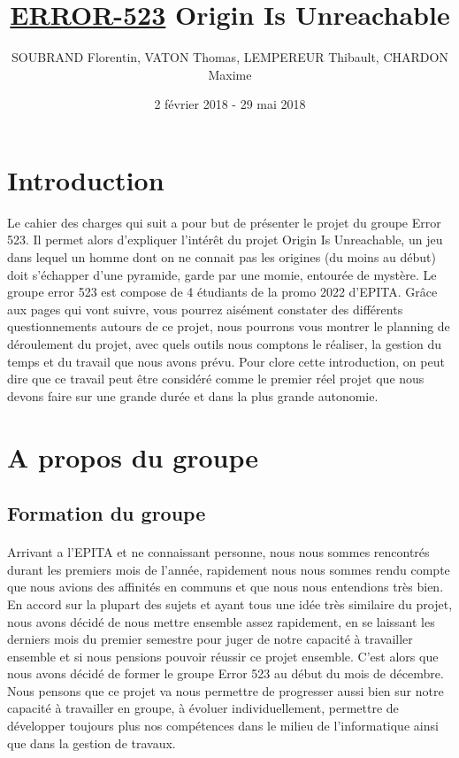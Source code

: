 \documentclass[12pt,a4paper]{article}
\title{\textbf { \huge{\underline{ERROR-523}} \bigbreak  \large{Origin Is Unreachable}}}
\author{SOUBRAND Florentin, VATON Thomas, LEMPEREUR Thibault, CHARDON Maxime}
\date {2 février 2018 - 29 mai 2018}
\begin{document}
\pagestyle{fancy}




\newpage
\thispagestyle{empty}
\tableofcontents

\newpage

\section{Introduction}
Le cahier des charges qui suit a pour but de présenter le projet du groupe Error 523.
Il permet alors d'expliquer l'intérêt du projet Origin Is Unreachable, un jeu dans lequel un homme dont
on ne connait pas les origines (du moins au début) doit s'échapper d'une pyramide, garde par une
momie, entourée de mystère.
Le groupe error 523 est compose de 4 étudiants de la promo 2022 d’EPITA.
Grâce aux pages qui vont suivre, vous pourrez aisément constater des différents questionnements
autours de ce projet, nous pourrons vous montrer le planning de déroulement du projet, avec quels
outils nous comptons le réaliser, la gestion du temps et du travail que nous avons prévu.
Pour clore cette introduction, on peut dire que ce travail peut être considéré comme le premier réel
projet que nous devons faire sur une grande durée et dans la plus grande autonomie.

\newpage
\section {A propos du groupe}
\subsection{Formation du groupe}
\paragraph{}
Arrivant a l'EPITA et ne connaissant personne, nous nous sommes rencontrés durant les premiers mois de l'année, rapidement nous nous sommes rendu compte que nous avions des affinités en communs et que nous nous entendions très bien. En accord sur la plupart des sujets et ayant tous une idée très similaire du projet, nous avons décidé de nous mettre ensemble assez rapidement, en se laissant les derniers mois du premier semestre pour juger de notre capacité à travailler ensemble et si nous pensions pouvoir réussir ce projet ensemble. C'est alors que nous avons décidé de former le groupe Error 523 au début du mois de décembre. Nous pensons que ce projet va nous permettre de progresser aussi bien sur notre capacité à travailler en groupe, à évoluer individuellement, permettre de développer toujours plus nos compétences dans le milieu de l'informatique ainsi que dans la gestion de travaux.
\end{document}
